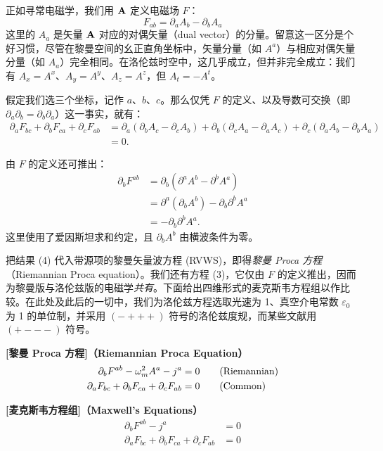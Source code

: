 正如寻常电磁学，我们用 $\mathbf{A}$ 定义电磁场 $F$：
\begin{equation}
F_{ab} = \partial_{a} A_{b} - \partial_{b} A_{a} \tag{2}
\end{equation}
这里的 $A_a$ 是矢量 $\mathbf{A}$ 对应的对偶矢量（dual vector）的分量。留意这一区分是个好习惯，尽管在黎曼空间的幺正直角坐标中，矢量分量（如 $A^{a}$）与相应对偶矢量分量（如 $A_{a}$）完全相同。在洛伦兹时空中，这几乎成立，但并非完全成立：我们有 $A_{x} = A^{x}$、$A_{y} = A^{y}$、$A_{z} = A^{z}$，但 $A_{t} = -A^{t}$。

假定我们选三个坐标，记作 $a$、$b$、$c$。那么仅凭 $F$ 的定义、以及导数可交换（即 $\partial_{a}\partial_{b} = \partial_{b}\partial_{a}$）这一事实，就有：
\begin{align}
\partial_{a} F_{bc} + \partial_{b} F_{ca} + \partial_{c} F_{ab}
&= \partial_{a}(\partial_{b} A_{c} - \partial_{c} A_{b})
 + \partial_{b}(\partial_{c} A_{a} - \partial_{a} A_{c})
 + \partial_{c}(\partial_{a} A_{b} - \partial_{b} A_{a}) \nonumber\\
&= 0. \tag{3}
\end{align}

由 $F$ 的定义还可推出：
\begin{align}
\partial_{b} F^{ab}
&= \partial_{b}(\partial^{a} A^{b} - \partial^{b} A^{a}) \nonumber\\
&= \partial^{a}(\partial_{b} A^{b}) - \partial_{b}\partial^{b} A^{a} \nonumber\\
&= -\partial_{b}\partial^{b} A^{a}. \tag{4}
\end{align}
这里使用了爱因斯坦求和约定，且 $\partial_{b} A^{b}$ 由横波条件为零。

把结果 (4) 代入带源项的黎曼矢量波方程 (RVWS)，即得\emph{黎曼 Proca 方程}（Riemannian Proca equation）。我们还有方程 (3)，它仅由 $F$ 的定义推出，因而为黎曼版与洛伦兹版的电磁学\emph{共有}。下面给出四维形式的麦克斯韦方程组以作比较。在此处及此后的一切中，我们为洛伦兹方程选取光速为 1、真空介电常数 $\varepsilon_{0}$ 为 1 的单位制，并采用 $(-+++)$ 符号的洛伦兹度规，而某些文献用 $(+---)$ 符号。

\begin{keybox}
\textbf{[黎曼 Proca 方程]（Riemannian Proca Equation）}
\begin{align}
\partial_{b} F^{ab} - \omega_m^{2} A^{a} - j^{a} &= 0 \tag{Riemannian}\\
\partial_{a} F_{bc} + \partial_{b} F_{ca} + \partial_{c} F_{ab} &= 0 \tag{Common}
\end{align}

\textbf{[麦克斯韦方程组]（Maxwell's Equations）}
\begin{align}
\partial_{b} F^{ab} - j^{a} &= 0 \tag{Lorentzian}\\
\partial_{a} F_{bc} + \partial_{b} F_{ca} + \partial_{c} F_{ab} &= 0 \tag{Common}
\end{align}
\end{keybox}

